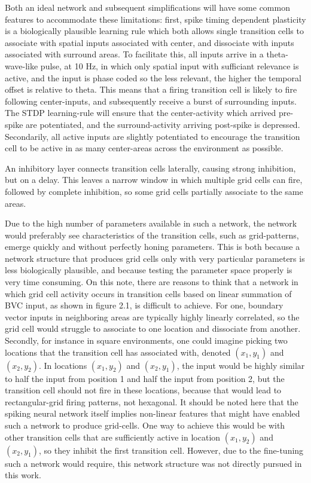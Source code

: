 \documentclass{article}
\begin{document}
    Both an ideal network and subsequent simplifications will have some common features to accommodate these limitations: first, spike timing dependent plasticity is a biologically plausible learning rule which both allows single transition cells to associate with spatial inputs associated with center, and dissociate with inputs associated with surround areas. To facilitate this, all inputs arrive in a theta-wave-like pulse, at 10 Hz, in which only spatial input with sufficiant relevance is active, and the input is phase coded so the less relevant, the higher the temporal offset is relative to theta. This means that a firing transition cell is likely to fire following center-inputs, and subsequently receive a burst of surrounding inputs. The STDP learning-rule will ensure that the center-activity which arrived pre-spike are potentiated, and the surround-activity arriving post-spike is depressed. Secondarily, all active inputs are slightly potentiated to encourage the transition cell to be active in as many center-areas across the environment as possible.
    
    An inhibitory layer connects transition cells laterally, causing strong inhibition, but on a delay. This leaves a narrow window in which multiple grid cells can fire, followed by complete inhibition, so some grid cells partially associate to the same areas.

    Due to the high number of parameters available in such a network, the network would preferably see characteristics of the transition cells, such as grid-patterns, emerge quickly and without perfectly honing parameters.
    This is both because a network structure that produces grid cells only with very particular parameters is less biologically plausible, and because testing the parameter space properly is very time consuming. On this note, there are reasons to think that a network in which grid cell activity occurs in transition cells based on linear summation of BVC input, as shown in figure 2.1, is difficult to achieve. For one, boundary vector inputs in neighboring areas are typically highly linearly correlated, so the grid cell would struggle to associate to one location and dissociate from another. Secondly, for instance in square environments, one could imagine picking two locations that the transition cell has associated with, denoted \((x_1, y_1)\) and \((x_2, y_2)\). In locations \((x_1, y_2)\) and \((x_2, y_1)\), the input would be highly similar to half the input from position 1 and half the input from position 2, but the transition cell should not fire in these locations, because that would lead to rectangular-grid firing patterns, not hexagonal. It should be noted here that the spiking neural network itself implies non-linear features that might have enabled such a network to produce grid-cells. One way to achieve this would be with other transition cells that are sufficiently active in location \((x_1, y_2)\) and \((x_2, y_1)\), so they inhibit the first transition cell. However, due to the fine-tuning such a network would require, this network structure was not directly pursued in this work.
\end{document}
